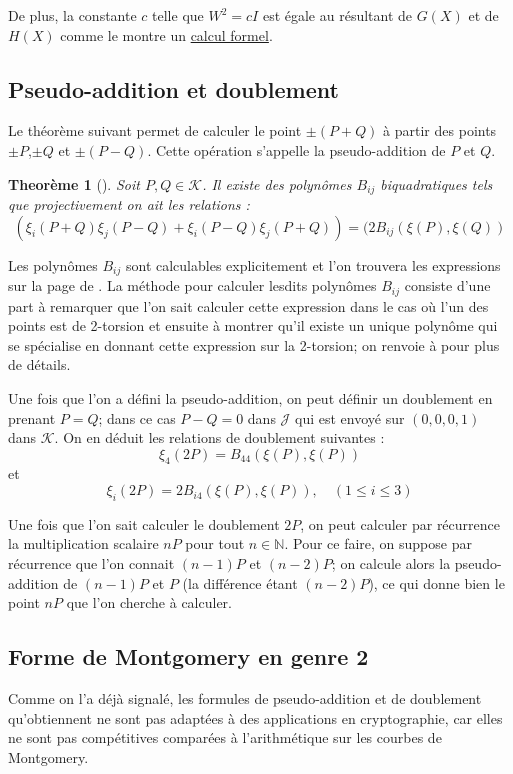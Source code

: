 \documentclass[a4paper]{article}
\newtheorem{theoreme}{Theorème}[section]
\theoremstyle{definition}
\theoremstyle{remark}
\numberwithin{equation}{section}
\begin{document}
De plus, la constante $c$ telle que $W^2 = cI$ est égale au résultant de $G(X)$ et de $H(X)$ comme le montre un \href{run:./add2tors.sag}{calcul formel}.

\subsection{Pseudo-addition et doublement}
Le théorème suivant permet de calculer le point $\pm (P+Q)$ à partir des points $\pm P$,$\pm Q$ et $\pm(P-Q)$. Cette opération s'appelle la pseudo-addition de $P$ et $Q$.

\begin{theoreme}[\citet{cassels-Flynn}]
Soit $P,Q \in \mathcal{K}$. Il existe des polynômes $B_{ij}$ biquadratiques tels que projectivement on ait les relations :
$$(\xi_i(P+Q)\xi_j(P-Q) + \xi_i(P-Q)\xi_j(P+Q)) = (2B_{ij}(\xi(P),\xi(Q))$$
\end{theoreme}

Les polynômes $B_{ij}$ sont calculables explicitement et l'on trouvera les expressions sur la page de \citet{biquad}. La méthode pour calculer lesdits polynômes $B_{ij}$ consiste d'une part à remarquer que l'on sait calculer cette expression dans le cas où l'un des points est de 2-torsion et ensuite à montrer qu'il existe un unique polynôme qui se spécialise en donnant cette expression sur la 2-torsion; on renvoie à \citet{cassels-Flynn} pour plus de détails.

Une fois que l'on a défini la pseudo-addition, on peut définir un doublement en prenant $P=Q$; dans ce cas $P-Q = 0$ dans $\mathcal{J}$ qui est envoyé sur $(0,0,0,1)$ dans $\mathcal{K}$. On en déduit les relations de doublement suivantes :
$$\xi_4(2P) = B_{44}(\xi(P),\xi(P))$$
et
$$\xi_i(2P) = 2B_{i4}(\xi(P),\xi(P)), \quad (1\leq i \leq 3)$$

Une fois que l'on sait calculer le doublement $2P$, on peut calculer par récurrence la multiplication scalaire $nP$ pour tout $n\in\mathbb{N}$. Pour ce faire, on suppose par récurrence que l'on connait $(n-1)P$ et $(n-2)P$; on calcule alors la pseudo-addition de $(n-1)P$ et $P$ (la différence étant $(n-2)P$), ce qui donne bien le point $nP$ que l'on cherche à calculer.

\subsection{Forme de Montgomery en genre 2}
Comme on l'a déjà signalé, les formules de pseudo-addition et de doublement qu'obtiennent \citet{cassels-Flynn} ne sont pas adaptées à des applications en cryptographie, car elles ne sont pas compétitives comparées à l'arithmétique sur les courbes de Montgomery.
\end{document}
